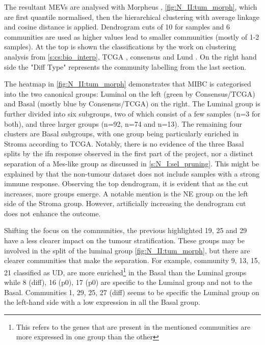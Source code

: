 The resultant MEVs are analysed with Morpheus \citep{Broad-InstituteUnknown-kn}, \cref{fig:N_II:tum_morph}, which are first quantile normalised, then the hierarchical clustering with average linkage and cosine distance is applied. Dendrogram cuts of 10 for samples and 6 communities are used as higher values lead to smaller communities (mostly of 1-2 samples). At the top is shown the classifications by the work on clustering analysis from \cref{s:cs:bio_interp}, TCGA \citep{Robertson2017-mg}, consensus \citep{Kamoun2020-tj} and Lund \citep{Marzouka2018-ge}. On the right hand side the "Diff Type" represents the community labelling from the last section.

The heatmap in \cref{fig:N_II:tum_morph} demonstrates that MIBC is categorised into the two canonical groups: Luminal on the left (green by Consensus/TCGA) and Basal (mostly blue by Consensus/TCGA) on the right. The Luminal group is further divided into six subgroups, two of which consist of a few samples (n=3 for both), and three larger groups (n=92, n=74 and n=13). The remaining four clusters are Basal subgroups, with one group being particularly enriched in Stroma according to TCGA. Notably, there is no evidence of the three Basal splits by the \acrfull{ifn} response observed in the first part of the project, nor a distinct separation of a Mes-like group as discussed in \cref{s:N_I:sel_pruning}. This might be explained by that the non-tumour dataset does not include samples with a strong immune response. Observing the top dendrogram, it is evident that as the cut increases, more groups emerge. A notable mention is the NE group on the left side of the Stroma group. However, artificially increasing the dendrogram cut does not enhance the outcome.

Shifting the focus on the communities, the previous highlighted 19, 25 and 29 have a less clearer impact on the tumour stratification. These groups may be involved in the split of the luminal group \cref{fig:N_II:tum_morph}, but there are clearer communities that make the separation. For example, community 9, 13, 15, 21 classified as UD, are more enriched\footnote{This refers to the genes that are present in the mentioned communities are more expressed in one group than the other} in the Basal than the Luminal groups while 8 (diff), 16 (p0), 17 (p0) are specific to the Luminal group and not to the Basal. Communities 1, 29, 25, 27 (diff) seems to be specific the Luminal group on the left-hand side with a low expression in all the Basal group. 

